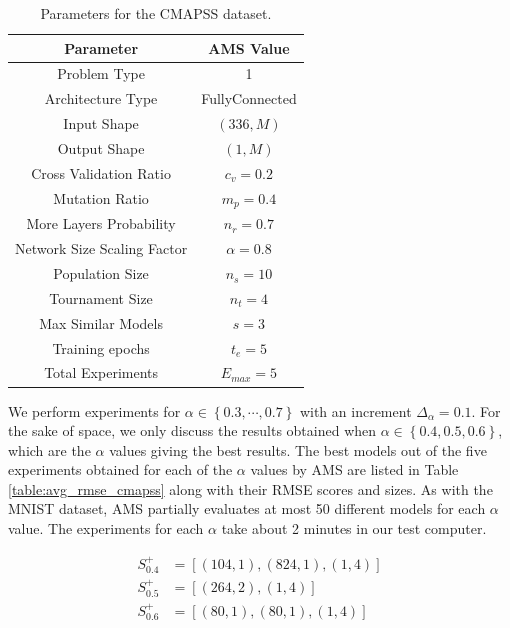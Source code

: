 \documentclass[12pt]{elsart}%
\begin{document}
\begin{table}[!htb]
\begin{center}
\begin{tabular}{| c | c |}
\hline
Parameter & AMS Value \\
\hline
Problem Type & 1 \\
Architecture Type & FullyConnected \\
Input Shape & $(336, M)$  \\
Output Shape & $(1, M)$ \\
Cross Validation Ratio & $c_v = 0.2$ \\
Mutation Ratio & $m_p = 0.4$ \\
More Layers Probability & $n_r = 0.7$ \\
Network Size Scaling Factor & $\alpha = 0.8$ \\
Population Size & $n_s = 10$ \\
Tournament Size & $n_t = 4$ \\
Max Similar Models & $s = 3$ \\
Training epochs & $t_e = 5$\\
Total Experiments & $E_{max} = 5$ \\
\hline
\end{tabular}
\end{center}
\caption{Parameters for the CMAPSS dataset.}
\label{table:CMAPSS_params}
\end{table}

We perform experiments for $\alpha \in \left\lbrace 0.3, \cdots, 0.7 \right\rbrace$ with an increment $\Delta_\alpha = 0.1$. For the sake of space, we only discuss the results obtained when $\alpha \in \left\lbrace 0.4, 0.5, 0.6 \right\rbrace$, which are the $\alpha$ values giving the best results. The best models out of the five experiments obtained for each of the $\alpha$ values by AMS are listed in Table \ref{table:avg_rmse_cmapss} along with their RMSE scores and sizes. As with the MNIST dataset, AMS partially evaluates at most 50 different models for each $\alpha$ value. The experiments for each $\alpha$ take about 2 minutes in our test computer.

\begin{align*}
S^+_{0.4} & = \left[ (104, 1), (824, 1), (1, 4) \right] \\
S^+_{0.5} & = \left[ (264, 2), (1, 4) \right] \\
S^+_{0.6} & = \left[ (80, 1), (80, 1), (1, 4) \right] \\
\end{align*}
\end{document}

